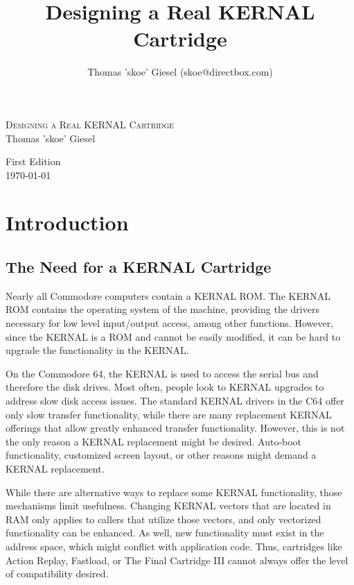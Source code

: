 \documentclass[a4paper]{memoir}
\title{Designing a Real KERNAL Cartridge}
\author{
Thomas 'skoe' Giesel
(skoe@directbox.com)
}
\begin{document}
\hsize

\pagestyle{empty}
\begin{center}

\vspace*{5cm}
\textsc{\huge Designing a Real KERNAL Cartridge}\\[2cm]
{\large Thomas 'skoe' Giesel}

\vfill

{\large First Edition \\[0.5cm] \today}

\end{center}

\clearpage

\tableofcontents

\chapter{Introduction}

\section{The Need for a KERNAL Cartridge}

Nearly all Commodore computers contain a KERNAL ROM. The KERNAL ROM
contains the operating system of the machine, providing the drivers
necessary for low level input/output access, among other functions.
However, since the KERNAL is a ROM and cannot be easily modified, it
can be hard to upgrade the functionality in the KERNAL.

On the Commodore 64, the KERNAL is used to access the serial bus and
therefore the disk drives. Most often, people look to KERNAL
upgrades to address slow disk access issues.  The standard KERNAL
drivers in the C64 offer only slow transfer functionality, while
there are many replacement KERNAL offerings that allow greatly
enhanced transfer functionality.  However, this is not the only
reason a KERNAL replacement might be desired.  Auto-boot
functionality, customized screen layout, or other reasons might
demand a KERNAL replacement.

While there are alternative ways to
replace some KERNAL functionality, those mechanisms limit
usefulness.  Changing KERNAL vectors that are located in RAM only
applies to callers that utilize those vectors, and only vectorized
functionality can be enhanced.  As well, new functionality must
exist in the address space, which might conflict with application
code.  Thus, cartridges like Action Replay, Fastload, or The Final
Cartridge III cannot always offer the level of compatibility
desired.
\end{document}
